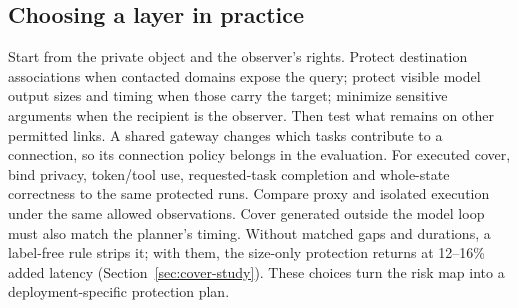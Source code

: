 \subsection{Choosing a layer in practice}
Start from the private object and the observer's rights. Protect destination associations when contacted domains expose the query; protect visible model output sizes and timing when those carry the target; minimize sensitive arguments when the recipient is the observer. Then test what remains on other permitted links. A shared gateway changes which tasks contribute to a connection, so its connection policy belongs in the evaluation. For executed cover, bind privacy, token/tool use, requested-task completion and whole-state correctness to the same protected runs. Compare proxy and isolated execution under the same allowed observations. Cover generated outside the model loop must also match the planner's timing. Without matched gaps and durations, a label-free rule strips it; with them, the size-only protection returns at 12--16\% added latency (Section~\ref{sec:cover-study}). These choices turn the risk map into a deployment-specific protection plan.
